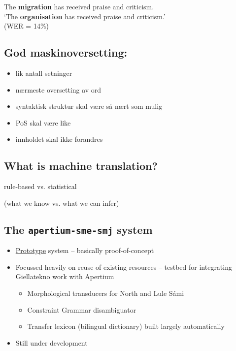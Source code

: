 \documentclass[a4paper,english,12pt]{article}
\begin{document}
\begin{spacing}{1.0}
The \textbf{migration} has received praise and criticism.\\

`The \textbf{organisation} has received praise and criticism.'\\ (WER = 14\%)\\


\subsection{God maskinoversetting:}
\begin{itemize}
  \item lik antall setninger
  \item nærmeste oversetting av ord
  \item syntaktisk struktur skal være så nært som mulig
  \item PoS skal være like
  \item innholdet skal ikke forandres
\end{itemize}
 


 
\subsection{What is machine translation?}

  \begin{centering}

    {\Large rule-based vs. statistical}

    (what we know vs. what we can infer)

  \end{centering}

 


 
\subsection{The {\tt apertium-sme-smj} system}

\begin{itemize}
  \item \underline{Prototype} system -- basically proof-of-concept
  \item Focussed heavily on reuse of existing resources -- testbed for 
    integrating Giellatekno work with Apertium
  \begin{itemize}
    \item Morphological transducers for North and Lule Sámi
    \item Constraint Grammar disambiguator
    \item Transfer lexicon (bilingual dictionary) built largely automatically
  \end{itemize}
  \item Still under development
\end{itemize}


\end{spacing}
\end{document}
